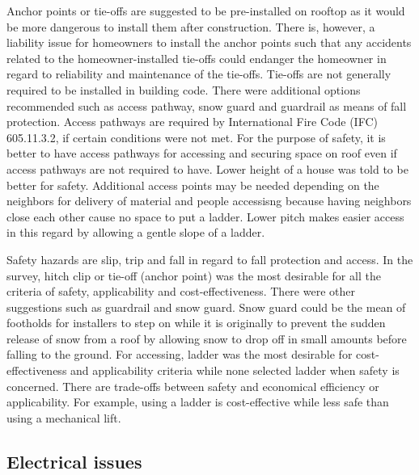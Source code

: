 \documentclass[]{article}
\begin{document}
Anchor points or tie-offs are suggested to be pre-installed on rooftop
as it would be more dangerous to install them after construction. There
is, however, a liability issue for homeowners to install the anchor
points such that any accidents related to the homeowner-installed
tie-offs could endanger the homeowner in regard to reliability and
maintenance of the tie-offs. Tie-offs are not generally required to be
installed in building code. There were additional options recommended
such as access pathway, snow guard and guardrail as means of fall
protection. Access pathways are required by International Fire Code
(IFC) 605.11.3.2, if certain conditions were not met. For the purpose of
safety, it is better to have access pathways for accessing and securing
space on roof even if access pathways are not required to have. Lower
height of a house was told to be better for safety. Additional access
points may be needed depending on the neighbors for delivery of material
and people accessisng because having neighbors close each other cause no
space to put a ladder. Lower pitch makes easier access in this regard by
allowing a gentle slope of a ladder.

Safety hazards are slip, trip and fall in regard to fall protection and
access. In the survey, hitch clip or tie-off (anchor point) was the most
desirable for all the criteria of safety, applicability and
cost-effectiveness. There were other suggestions such as guardrail and
snow guard. Snow guard could be the mean of footholds for installers to
step on while it is originally to prevent the sudden release of snow
from a roof by allowing snow to drop off in small amounts before falling
to the ground. For accessing, ladder was the most desirable for
cost-effectiveness and applicability criteria while none selected ladder
when safety is concerned. There are trade-offs between safety and
economical efficiency or applicability. For example, using a ladder is
cost-effective while less safe than using a mechanical lift.

\hypertarget{electrical-issues}{%
\subsection{Electrical issues}\label{electrical-issues}}
\end{document}
